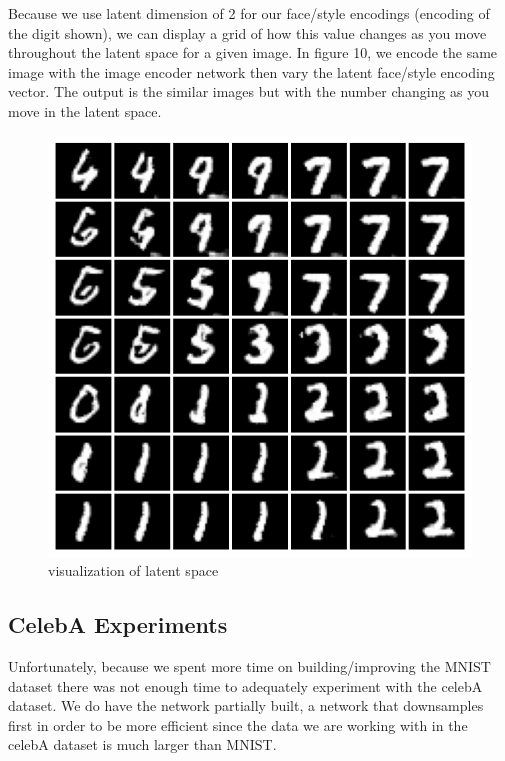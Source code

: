 \documentclass{article}
\begin{document}
\clearpage

Because we use latent dimension of 2 for our face/style encodings (encoding of the digit shown),
we can display a grid of how this value changes as you move throughout the latent space for a given image.
In figure 10, we encode the same image with the image encoder network then vary the latent face/style encoding vector.
The output is the similar images but with the number changing as you move in the latent space.

\begin{figure}[hbt]
	\centering
	\includegraphics[scale=0.5]{images/mnist_latent_crisp_50.png}
	\caption{visualization of latent space}
	\label{fig:fig3}

\end{figure}


\clearpage

\subsection{CelebA Experiments}

Unfortunately, because we spent more time on building/improving the MNIST dataset there was not enough time to adequately experiment with
the celebA dataset. We do have the network partially built, a network that downsamples first in order to be more efficient since the data
we are working with in the celebA dataset is much larger than MNIST.
\end{document}
